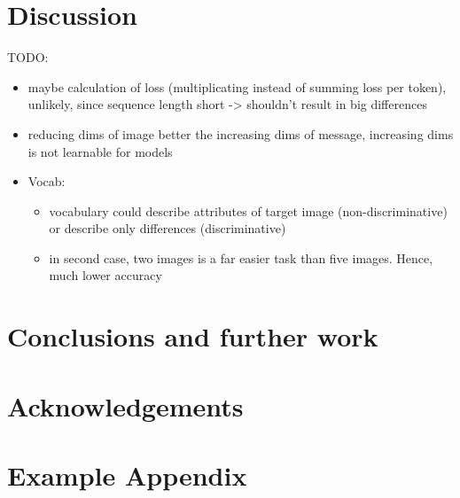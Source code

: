 \documentclass[11pt]{article}
\begin{document}
\section{Discussion}
TODO:
\begin{itemize}
  \item maybe calculation of loss (multiplicating instead of summing loss per token), unlikely, since sequence length short -> shouldn't result in big differences
  \item reducing dims of image better the increasing dims of message, increasing dims is not learnable for models
  \item Vocab:
        \begin{itemize}
          \item vocabulary could describe attributes of target image (non-discriminative) or describe only differences (discriminative)
          \item in second case, two images is a far easier task than five images. Hence, much lower accuracy
        \end{itemize}
\end{itemize}



\section{Conclusions and further work}

\section*{Acknowledgements}




\appendix

\section{Example Appendix}
\end{document}
